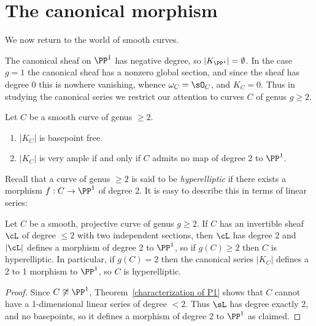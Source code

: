 \section{The canonical morphism}

We now return to the world of smooth curves.

 The canonical sheaf on $\PP^1$ has negative degree, so $|K_{\PP^1}| = \emptyset$. In the case $g=1$ the canonical sheaf     has a nonzero global section, and since the sheaf has degree 0 this is nowhere vanishing, whence
 $\omega_C = \sO_C$, and $K_C = 0$. Thus in studying the canonical series we restrict our attention to curves $C$ of genus $g\geq 2$. 
 
 \begin{theorem}\label{canonical series is very ample} Let $C$ be a smooth curve of genus $\geq 2$.
\begin{enumerate}
 \item $|K_C|$ is basepoint free.
 \item $|K_C|$ is very ample if and only if $C$ admits no map of degree 2 to $\PP^1$.
\end{enumerate}
\end{theorem}

Recall that a curve of genus $\geq 2$
is said to be \emph{hyperelliptic} if there exists a morphism $f: C \to \PP^1$ of degree 2. 
It is easy to describe this in terms of linear series:

\begin{lemma}\label{deg 2 morphism}
Let $C$ be a smooth, projective curve of genus $g\geq 2$. If $C$ has an invertible sheaf $\cL$ of degree $\leq 2$ with two independent sections, then $\cL$ has degree 2 and
$|\cL|$ defines a morphism of degree 2 to $\PP^{1}$, so if $g(C)\geq 2$ then $C$ is hyperelliptic. In particular, if $g(C) = 2$ then the canonical series $|K_{C}|$ defines a 2 to 1 morphism to $\PP^{1}$, so $C$ is hyperelliptic.
\end{lemma}

\begin{proof}
Since $C \not\cong \PP^1$,  Theorem~\ref{characterization of P1} shows that $C$ cannot have a 1-dimensional linear series
of degree $< 2$. Thus $\sL$ has degree exactly 2, and no basepoints, so it defines a morphism of degree 2 to $\PP^1$ as claimed.
\end{proof}

